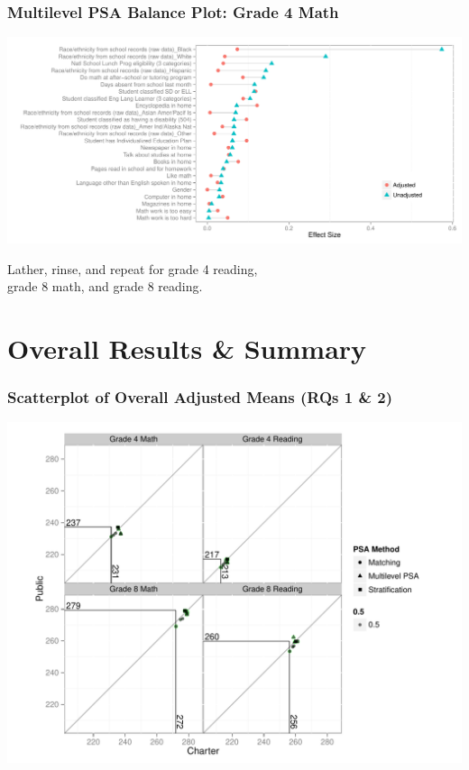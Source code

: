 \documentclass[10pt,handout,mathserif]{beamer}
\begin{document}
\begin{frame}[c]
	\frametitle{Multilevel PSA Balance Plot: Grade 4 Math}
	\begin{center}
	\includegraphics[height=\textheight,keepaspectratio]{../Figures2009/g4math-mlpsa-ctree-balance.pdf}
	\end{center}
\end{frame}

\begin{frame}[c]
    \begin{center}
    Lather, rinse, and repeat for grade 4 reading,\\grade 8 math, and grade 8 reading.
    \end{center}
\end{frame}


\section{Overall Results \& Summary}

\begin{frame}[c]
	\frametitle{Scatterplot of Overall Adjusted Means (RQs 1 \& 2)}
	\begin{center}
	\includegraphics[width=0.85\paperwidth,keepaspectratio]{../Figures2009/OverallScatter}
	\end{center}
\end{frame}
\end{document}
